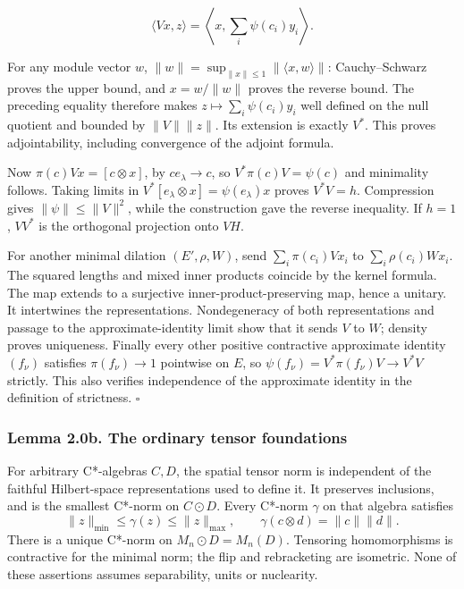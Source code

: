 \documentclass[
  11pt,
]{article}
\begin{document}
\[
\langle Vx,z\rangle=\left\langle x,\sum_i\psi(c_i)y_i\right\rangle.
\]

For any module vector \(w\),
\(\|w\|=\sup_{\|x\|\leq1}\|\langle x,w\rangle\|\): Cauchy--Schwarz
proves the upper bound, and \(x=w/\|w\|\) proves the reverse bound. The
preceding equality therefore makes \(z\mapsto\sum_i\psi(c_i)y_i\) well
defined on the null quotient and bounded by \(\|V\|\|z\|\). Its
extension is exactly \(V^*\). This proves adjointability, including
convergence of the adjoint formula.

Now \(\pi(c)Vx=[c\otimes x]\), by \(ce_\lambda\to c\), so
\(V^*\pi(c)V=\psi(c)\) and minimality follows. Taking limits in
\(V^*[e_\lambda\otimes x]=\psi(e_\lambda)x\) proves \(V^*V=h\).
Compression gives \(\|\psi\|\leq\|V\|^2\), while the construction gave
the reverse inequality. If \(h=1\), \(VV^*\) is the orthogonal
projection onto \(VH\).

For another minimal dilation \((E',\rho,W)\), send
\(\sum_i\pi(c_i)Vx_i\) to \(\sum_i\rho(c_i)Wx_i\). The squared lengths
and mixed inner products coincide by the kernel formula. The map extends
to a surjective inner-product-preserving map, hence a unitary. It
intertwines the representations. Nondegeneracy of both representations
and passage to the approximate-identity limit show that it sends \(V\)
to \(W\); density proves uniqueness. Finally every other positive
contractive approximate identity \((f_\nu)\) satisfies
\(\pi(f_\nu)\to1\) pointwise on \(E\), so
\(\psi(f_\nu)=V^*\pi(f_\nu)V\to V^*V\) strictly. This also verifies
independence of the approximate identity in the definition of
strictness. \(\square\)

\subsubsection{Lemma 2.0b. The ordinary tensor
foundations}\label{lemma-2.0b.-the-ordinary-tensor-foundations}

For arbitrary C*-algebras \(C,D\), the spatial tensor norm is
independent of the faithful Hilbert-space representations used to define
it. It preserves inclusions, and is the smallest C*-norm on
\(C\odot D\). Every C*-norm \(\gamma\) on that algebra satisfies \[
\|z\|_{\min}\leq\gamma(z)\leq\|z\|_{\max},\qquad
\gamma(c\otimes d)=\|c\|\|d\|.
\] There is a unique C*-norm on \(M_n\odot D=M_n(D)\). Tensoring
homomorphisms is contractive for the minimal norm; the flip and
rebracketing are isometric. None of these assertions assumes
separability, units or nuclearity.
\end{document}
